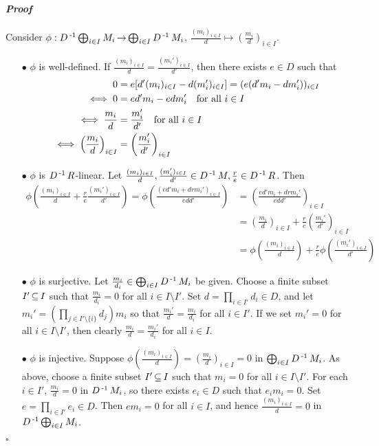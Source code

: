 \documentclass[11pt]{book}
\theoremstyle{definition}   \newtheorem{defn}[counter]{Definition} %
\newcommand{\bs}{\setminus}   \newcommand{\A}{\mathcal{A}}   \newcommand{\sy}{\textnormal{Syl}}   \newcommand{\size}[1]{\left| #1 \right|}
\DeclareMathOperator{\ra}{\rightarrow}   \DeclareMathOperator{\Poly}{\mathbf{P}}   \DeclareMathOperator{\spn}{\textnormal{span}}   \DeclareMathOperator{\aut}{\textnormal{Aut}}
\newenvironment{prf}{\paragraph{\textit{Proof}}}{\hfill$\square$}
\numberwithin{counter}{chapter}
\begin{document}
\begin{prf}
Consider $\phi : D\inv \bigoplus_{i\in I} M_i \ra \bigoplus_{i \in I} D\inv M_i$, $\frac{(m_i)_{i \in I}}{d} \mapsto \left(\frac{m_i}{d}\right)_{i \in I}$.
\begin{enumerate}
\item[$\bullet$] $\phi$ is well-defined. If $\frac{(m_i)_{i \in I}}{d} = \frac{(m_i')_{i \in I}}{d'}$, then there exists $e \in D$ such that
\begin{align*}
0 &= e[d'(m_i)_{i \in I} - d(m_i')_{i \in I}] = (e(d'm_i - dm_i'))_{i \in I} \\
\iff 0 &= ed'm_i - edm_i' \quad \textnormal{for all } i \in I \\
\iff \frac{m_i}{d} &= \frac{m_i'}{d'} \quad \textnormal{for all } i \in I \\
\iff \left(\frac{m_i}{d}\right)_{i \in I} &= \left(\frac{m_i'}{d'}\right)_{i \in I}
\end{align*}

\item[$\bullet$] $\phi$ is $D\operatorname{^{-1}} R$-linear. Let $\frac{(m_i)_{i \in I}}{d}, \frac{(m_i')_{i \in I}}{d'} \in D\operatorname{^{-1}} M, \frac{r}{e} \in D\operatorname{^{-1}} R$. Then
\begin{align*}
\phi \left(\frac{(m_i)_{i \in I}}{d} + \frac{r}{e} \frac{(m_i')_{i \in I}}{d'}\right) = \phi\left( \frac{(ed'm_i + drm_i')_{i \in I}}{edd'}\right) &= \left(\frac{ed'm_i + drm_i'}{edd'}\right)_{i \in I} \\
&= \left(\frac{m_i}{d}\right)_{i \in I} + \frac{r}{e} \left(\frac{m_i'}{d'}\right)_{i \in I} \\ &= \phi \left(\frac{(m_i)_{i \in I}}{d}\right) + \frac{r}{e} \phi \left(\frac{(m_i')_{i \in I}}{d'}\right)
\end{align*}

\item[$\bullet$] $\phi$ is surjective. Let $\frac{m_i}{d_i} \in \bigoplus_{i \in I} D\operatorname{^{-1}} M_i$ be given. Choose a finite subset $I' \operatorname{\subseteq} I$ such that $\frac{m_i}{d_i} = 0$ for all $i \in I \bs I'$. Set $d = \prod_{i \in I'} d_i \in D$, and let $m_i' = (\prod_{j \in I'\bs\{i\}} d_j) m_i$ so that $\frac{m_i'}{d} = \frac{m_i}{d_i}$ for all $i \in I'$. If we set $m_i' = 0$ for all $i \in I \bs I'$, then clearly $\frac{m_i}{d} = \frac{m_i'}{d_i}$ for all $i \in I$.

\item[$\bullet$] $\phi$ is injective. Suppose $\phi \left( \frac{(m_i)_{i \in I}}{d} \right) = \left(\frac{m_i}{d}\right)_{i \in I} = 0$ in $\bigoplus_{i \in I} D\operatorname{^{-1}} M_i$. As above, choose a finite subset $I' \operatorname{\subseteq} I$ such that $m_i = 0$ for all $i \in I \bs I'$. For each $i \in I'$, $\frac{m_i}{d} = 0$ in $D\operatorname{^{-1}} M_i$, so there exists $e_i \in D$ such that $e_i m_i = 0$. Set $e = \prod_{i \in I'} e_i \in D$. Then $em_i = 0$ for all $i \in I$, and hence $\frac{(m_i)_{i \in I}}{d} = 0$ in $D\operatorname{^{-1}} \bigoplus_{i \in I} M_i$.
\end{enumerate}
\end{prf}
\end{document}
